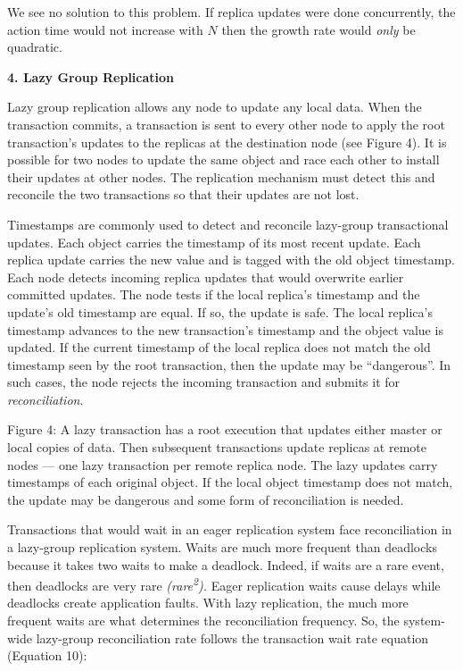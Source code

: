 \documentclass[a4paper,12pt,twoside,openright]{article}
\begin{document}
We see no solution to this problem. If replica updates were done
concurrently, the action time would not increase with \(N\) then the
growth rate would \emph{only} be quadratic.

\textbf{4. Lazy Group Replication}

Lazy group replication allows any node to update any local data. When
the transaction commits, a transaction is sent to every other node to
apply the root transaction's updates to the replicas at the destination
node (see Figure 4). It is possible for two nodes to update the same
object and race each other to install their updates at other nodes. The
replication mechanism must detect this and reconcile the two
transactions so that their updates are not lost.

Timestamps are commonly used to detect and reconcile lazy-group
transactional updates. Each object carries the timestamp of its most
recent update. Each replica update carries the new value and is tagged
with the old object timestamp. Each node detects incoming replica
updates that would overwrite earlier committed updates. The node tests
if the local replica's timestamp and the update's old timestamp are
equal. If so, the update is safe. The local replica's timestamp advances
to the new transaction's timestamp and the object value is updated. If
the current timestamp of the local replica does not match the old
timestamp seen by the root transaction, then the update may be
``dangerous''. In such cases, the node rejects the incoming transaction
and submits it for \emph{reconciliation}.

Figure 4: A lazy transaction has a root execution that updates either
master or local copies of data. Then subsequent transactions update
replicas at remote nodes --- one lazy transaction per remote replica
node. The lazy updates carry timestamps of each original object. If the
local object timestamp does not match, the update may be dangerous and
some form of reconciliation is needed.

Transactions that would wait in an eager replication system face
reconciliation in a lazy-group replication system. Waits are much more
frequent than deadlocks because it takes two waits to make a deadlock.
Indeed, if waits are a rare event, then deadlocks are very rare
\emph{(rare\textsuperscript{2}).} Eager replication waits cause delays
while deadlocks create application faults. With lazy replication, the
much more frequent waits are what determines the reconciliation
frequency. So, the system-wide lazy-group reconciliation rate follows
the transaction wait rate equation (Equation 10):
\end{document}
